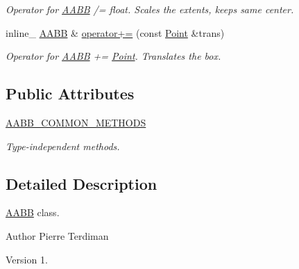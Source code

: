 \begin{DoxyCompactItemize}
\begin{DoxyCompactList}\small\item\em Operator for \hyperlink{class_a_a_b_b}{A\+A\+B\+B} /= float. Scales the extents, keeps same center. \end{DoxyCompactList}\item 
\hypertarget{class_a_a_b_b_a1aa2bcb5279bd03fc4b9e074e1249fec}{inline\+\_\+ \hyperlink{class_a_a_b_b}{A\+A\+B\+B} \& \hyperlink{class_a_a_b_b_a1aa2bcb5279bd03fc4b9e074e1249fec}{operator+=} (const \hyperlink{class_point}{Point} \&trans)}\label{class_a_a_b_b_a1aa2bcb5279bd03fc4b9e074e1249fec}

\begin{DoxyCompactList}\small\item\em Operator for \hyperlink{class_a_a_b_b}{A\+A\+B\+B} += \hyperlink{class_point}{Point}. Translates the box. \end{DoxyCompactList}\end{DoxyCompactItemize}
\subsection*{Public Attributes}
\begin{DoxyCompactItemize}
\item 
\hypertarget{class_a_a_b_b_a27373818e3e3da2d9b1681917916da81}{\hyperlink{class_a_a_b_b_a27373818e3e3da2d9b1681917916da81}{A\+A\+B\+B\+\_\+\+C\+O\+M\+M\+O\+N\+\_\+\+M\+E\+T\+H\+O\+D\+S}}\label{class_a_a_b_b_a27373818e3e3da2d9b1681917916da81}

\begin{DoxyCompactList}\small\item\em Type-\/independent methods. \end{DoxyCompactList}\end{DoxyCompactItemize}


\subsection{Detailed Description}
\hyperlink{class_a_a_b_b}{A\+A\+B\+B} class.

\begin{DoxyAuthor}{Author}
Pierre Terdiman 
\end{DoxyAuthor}
\begin{DoxyVersion}{Version}
1. 
\end{DoxyVersion}



